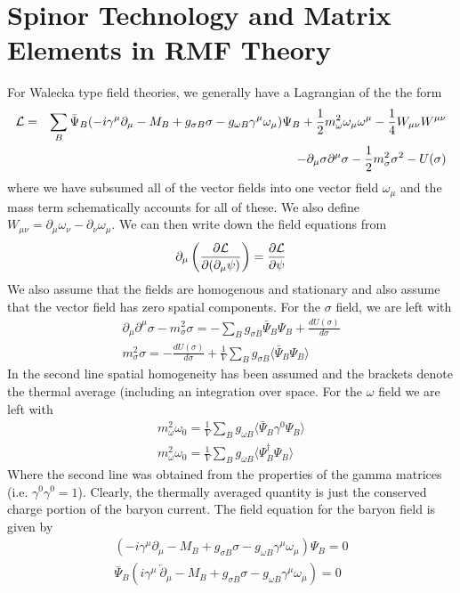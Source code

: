 \documentclass[12pt,letter]{article}
\newcommand{\pd}[2]{\frac{\partial #1}{\partial #2}}
\newcommand{\td}[2]{\frac{d #1}{d #2}}
\newcommand{\avg}[1]{\langle #1 \rangle}
\newcommand{\script}[1]{\begin{cal} #1 \end{cal} }
\begin{document}
\section{Spinor Technology and Matrix Elements in RMF Theory}
For Walecka type field theories, we generally have a Lagrangian of the the form 
\begin{eqnarray}
\script{L} &=& \sum_B \bar \Psi_B (-i \gamma^\mu \partial_\mu - M_B 
+ g_{\sigma B} \sigma - g_{\omega B} \gamma^\mu \omega_\mu)\Psi_B 
+ \frac{1}{2} m_\omega^2 \omega_\mu \omega^\mu 
- \frac{1}{4} W_{\mu \nu} W^{\mu \nu} \\
&& - \partial_\mu \sigma \partial^\mu \sigma 
- \frac{1}{2} m_\sigma^2 \sigma^2 - U(\sigma)
\end{eqnarray}
where we have subsumed all of the vector fields into one vector field 
$\omega_\mu$ and the mass term schematically accounts for all of these. We also
define $W_{\mu \nu} = \partial_\mu \omega_\nu - \partial_\nu \omega_\mu$.  We 
can then write down the field equations from 
\begin{eqnarray}
\partial_\mu \left(\pd{\script{L}}{(\partial_\mu \psi)}\right) =  
\pd{\script{L}}{\psi} 
\end{eqnarray}
We also assume that the fields are homogenous and stationary and also assume that the vector field has zero spatial components.  For the $\sigma$ field, we are left with
\begin{eqnarray}
\partial_\mu \partial^\mu \sigma - m_\sigma^2 \sigma = -\sum_B g_{\sigma B} \bar \Psi_B \Psi_B + \td{U(\sigma)}{\sigma} \\
m_\sigma^2 \sigma = -\td{U(\sigma)}{\sigma} + \frac{1}{V}\sum_B g_{\sigma B}\avg{ \bar \Psi_B \Psi_B}
\end{eqnarray}
In the second line spatial homogeneity has been assumed and the brackets denote the thermal average (including an integration over space.
For the $\omega$ field we are left with
\begin{eqnarray}
m_\omega^2\omega_0 = \frac{1}{V} \sum_B g_{\omega B} \avg{ \bar \Psi_B \gamma^0 \Psi_B} \\
m_\omega^2\omega_0 = \frac{1}{V} \sum_B g_{\omega B} \avg{ \Psi_B^\dagger \Psi_B}
\end{eqnarray}
Where the second line was obtained from the properties of the gamma matrices (i.e. $\gamma^0 \gamma^0 = 1$).  Clearly, the thermally averaged quantity is just the conserved charge portion of the baryon current.  
The field equation for the baryon field is given by
\begin{eqnarray}
(-i \gamma^\mu \partial_\mu - M_B + g_{\sigma B} \sigma - g_{\omega B} \gamma^\mu \omega_\mu)\Psi_B = 0 \\
\bar \Psi_B(i \gamma^\mu \ \overleftarrow{\partial}_\mu - M_B + g_{\sigma B} \sigma - g_{\omega B} \gamma^\mu \omega_\mu) = 0
\end{eqnarray}
\end{document}
